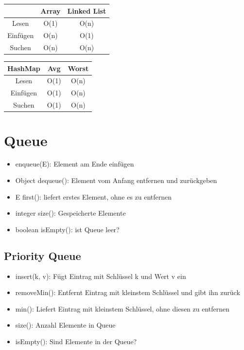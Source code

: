 \begin{multicols*}{4}
			\begin{tabular}{c | c | c}
				& Array & Linked List \\
				\hline
				Lesen & O(1) & O(n) \\
				Einfügen & O(n) & O(1)  \\
				Suchen & O(n) & O(n) \\
			\end{tabular}
		
			\begin{tabular}{c | c | c}
				\textbf{HashMap} & Avg & Worst \\
				\hline
				Lesen & O(1) & O(n) \\
				Einfügen & O(1) & O(n)  \\
				Suchen & O(1) & O(n) \\
			\end{tabular}


\columnbreak

\section{Queue}
	\begin{itemize}
		\item enqueue(E): Element am Ende einfügen
		\item Object dequeue(): Element vom Anfang entfernen und
		zurückgeben
		\item E first(): liefert erstes Element, ohne es zu entfernen
		\item integer size(): Gespeicherte Elemente
		\item boolean isEmpty(): ist Queue leer?
	\end{itemize}

	\subsection{Priority Queue}
		\begin{itemize}
			\item insert(k, v): Fügt Eintrag mit Schlüssel k und Wert v ein
			\item removeMin(): Entfernt Eintrag mit kleinstem Schlüssel und gibt ihn zurück
			\item min(): Liefert Eintrag mit kleinstem Schlüssel, ohne diesen zu entfernen
			\item size(): Anzahl Elemente in Queue
			\item isEmpty(): Sind Elemente in der Queue?
		\end{itemize}
		

\end{multicols*}
